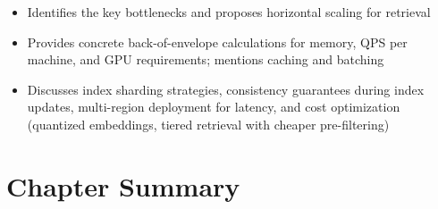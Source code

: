 \begin{interviewq}

\goodgreat
\begin{itemize}
    \item {} Identifies the key bottlenecks and proposes horizontal
          scaling for retrieval
    \item {} Provides concrete back-of-envelope calculations for memory,
          QPS per machine, and GPU requirements; mentions caching and batching
    \item {} Discusses index sharding strategies, consistency
          guarantees during index updates, multi-region deployment for latency,
          and cost optimization (quantized embeddings, tiered retrieval with
          cheaper pre-filtering)
\end{itemize}

\end{interviewq}


\section*{Chapter Summary}


